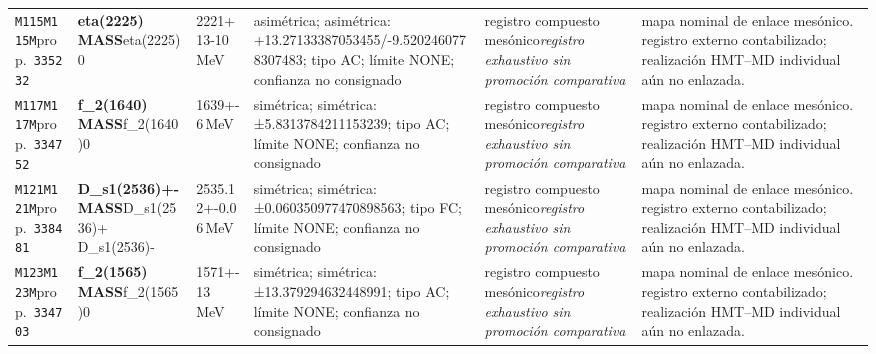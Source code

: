 \begin{landscape}
\begin{longtable}{L{1.85cm}L{4.45cm}L{2.35cm}L{4.05cm}L{3.35cm}L{7.15cm}}
\texttt{M115}\newline \texttt{M115M}\newline prop.\ \texttt{335232} & \textbf{eta(2225) MASS}\newline eta(2225)0 & 2221+13-10\,MeV & asimétrica; asimétrica: +13.27133387053455/-9.5202460778307483; tipo AC; límite NONE; confianza no consignado & registro compuesto mesónico\newline \emph{registro exhaustivo sin promoción comparativa} & mapa nominal de enlace mesónico. registro externo contabilizado; realización HMT--MD individual aún no enlazada. \\
\texttt{M117}\newline \texttt{M117M}\newline prop.\ \texttt{334752} & \textbf{f\_\allowbreak{}2(1640) MASS}\newline f\_\allowbreak{}2(1640)0 & 1639+-6\,MeV & simétrica; simétrica: ±5.8313784211153239; tipo AC; límite NONE; confianza no consignado & registro compuesto mesónico\newline \emph{registro exhaustivo sin promoción comparativa} & mapa nominal de enlace mesónico. registro externo contabilizado; realización HMT--MD individual aún no enlazada. \\
\texttt{M121}\newline \texttt{M121M}\newline prop.\ \texttt{338481} & \textbf{D\_\allowbreak{}s1(2536)+- MASS}\newline D\_\allowbreak{}s1(2536)+ \textbar{}\allowbreak{} D\_\allowbreak{}s1(2536)- & 2535.12+-0.06\,MeV & simétrica; simétrica: ±0.060350977470898563; tipo FC; límite NONE; confianza no consignado & registro compuesto mesónico\newline \emph{registro exhaustivo sin promoción comparativa} & mapa nominal de enlace mesónico. registro externo contabilizado; realización HMT--MD individual aún no enlazada. \\
\texttt{M123}\newline \texttt{M123M}\newline prop.\ \texttt{334703} & \textbf{f\_\allowbreak{}2(1565) MASS}\newline f\_\allowbreak{}2(1565)0 & 1571+-13\,MeV & simétrica; simétrica: ±13.379294632448991; tipo AC; límite NONE; confianza no consignado & registro compuesto mesónico\newline \emph{registro exhaustivo sin promoción comparativa} & mapa nominal de enlace mesónico. registro externo contabilizado; realización HMT--MD individual aún no enlazada. \\

\end{longtable}
\end{landscape}
